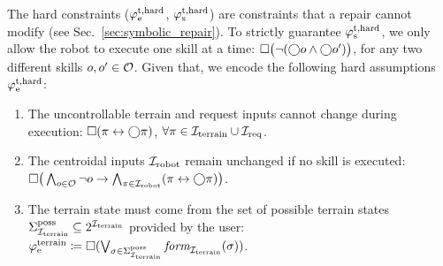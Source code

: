 \documentclass[letterpaper, 10 pt, conference]{ieeeconf}
\begin{document}
The hard constraints ($\varphi_\textrm{e}^\textrm{t,hard}$, $\varphi_\textrm{s}^\textrm{t,hard}$) are constraints that a repair cannot modify 
(see Sec.~\ref{sec:symbolic_repair}).
To strictly guarantee $\varphi_\textrm{s}^\textrm{t,hard}$,
we only allow the robot to execute one skill at a time:
    $\square\big(\neg (\bigcirc o \land \bigcirc o')\big)$, for any two different skills $o, o' \in {\mathcal O}$. Given that, 
we encode the following hard assumptions $\varphi_\textrm{e}^\textrm{t,hard}$:
\begin{enumerate}[label=\arabic*),ref=\arabic*]
    \item The uncontrollable terrain and request inputs 
    cannot change during execution:
    $\square (\pi \leftrightarrow \bigcirc \pi)$,
    $\forall \pi \in {\mathcal I}_{\textrm{terrain}} \cup {\mathcal I}_{\textrm{req}}$.
    \item The centroidal inputs ${\mathcal I}_{\textrm{robot}}$ remain unchanged if no skill is executed: 
    $\square\big(\bigwedge_{o\in{\mathcal O}} \neg o \to \bigwedge_{\pi\in{\mathcal I}_{\textrm{robot}}} (\pi \leftrightarrow \bigcirc \pi)\big)$.
    \item \label{assumption:poss_terrain}
    The terrain state must come from the set of possible terrain states $\Sigma_{{\mathcal I}_{\textrm{terrain}}}^{\textrm{poss}} \subseteq 2^{{\mathcal I}_{\textrm{terrain}}}$ provided by the user:
    $\varphi_\textrm{e}^\textrm{terrain} \coloneqq \square (
    \bigvee_{\sigma\in\Sigma_{{\mathcal I}_{\textrm{terrain}}}^{\textrm{poss}}}
    \textit{form}_{{\mathcal I}_{\textrm{terrain}}}(\sigma)
    )$.
\end{enumerate}




\end{document}

